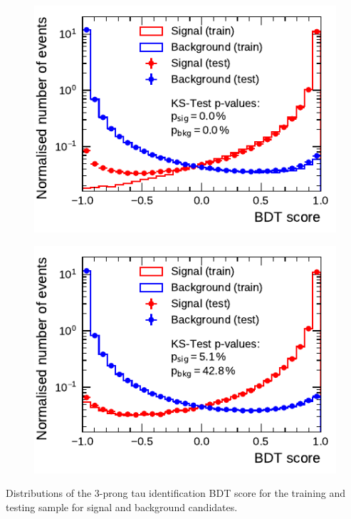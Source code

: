 \noindent
\begin{minipage}{\textwidth}
  \captionsetup{type=figure}
  \begin{subfigure}[t]{0.48\textwidth}
    \centering
    \includegraphics{./figures/bdt_perf/scores/grid_3p0317.pdf}
  \end{subfigure}\hfill
  \begin{subfigure}[t]{0.48\textwidth}
    \centering
    \includegraphics{./figures/bdt_perf/scores/grid_3p0327.pdf}
  \end{subfigure}
  \caption[Distribution of the tau identification BDT score
  (3-prong)]{Distributions of the 3-prong tau identification BDT score for the
    training and testing sample for signal and background candidates.}
  \label{fig:bdt_ks5_scores}
\end{minipage}

